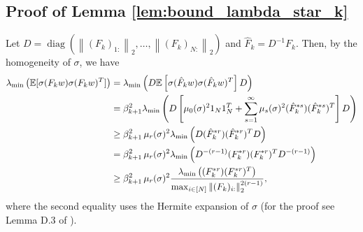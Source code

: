 \documentclass[11pt]{article}
\def\diag{\operatorname{\mathop{diag}}}
\newcommand{\E}{\mathbb{E}}
\newenvironment{proof}{\par\noindent{\bf Proof:\ }}{\hfill$\Box$\\[2mm]}
\newcommand{\norm}[1]{\left\|#1\right\|}
\newcommand{\svmin}[1]{\sigma_{\rm min}\left(#1\right)}
\newcommand{\evmin}[1]{\lambda_{\rm min}\left(#1\right)}
\def\max{\mathop{\rm max}\nolimits}
\begin{document}
\subsection{Proof of Lemma \ref{lem:bound_lambda_star_k}}\label{app:lem:bound_lambda_star_k}
    Let $D=\diag(\norm{(F_{k})_{1:}}_2, \ldots, \norm{(F_{k})_{N:}}_2)$ and $\hat{F}_{k}= D^{-1} F_{k}.$
    Then, by the homogeneity of $\sigma$, we have
    \begin{align*}
	\evmin{ \E [\sigma(F_{k}w)\sigma(F_{k}w)^T] } 
	&=\evmin{ D \E\left[\sigma(\hat{F}_{k}w)\sigma(\hat{F}_{k}w)^T\right] D } \\
	&=\beta_{k+1}^2 \evmin{D \left[\mu_0(\sigma)^2 1_N 1_N^T+\sum_{s=1}^{\infty}\mu_s(\sigma)^2 (\hat{F}_{k}^{*s}) (\hat{F}_{k}^{*s})^T \right] D}\\
	&\geq\beta_{k+1}^2\, \mu_r(\sigma)^2 \evmin{D (\hat{F}_{k}^{*r}) (\hat{F}_{k}^{*r})^T D}\\
	&=\beta_{k+1}^2\, \mu_r(\sigma)^2 \evmin{D^{-(r-1)} (F_{k}^{*r}) (F_{k}^{*r})^T D^{-(r-1)}}\\
	&\geq\beta_{k+1}^2\, \mu_r(\sigma)^2 \frac{\evmin{(F_{k}^{*r})(F_{k}^{*r})^T}}{\max_{i\in [N]}\norm{(F_{k})_{i:}}_2^{2(r-1)}} ,
    \end{align*}
where the second equality uses the Hermite expansion of $\sigma$ (for the proof see Lemma D.3 of \citep{QuynhMarco2020}).
\end{document}
